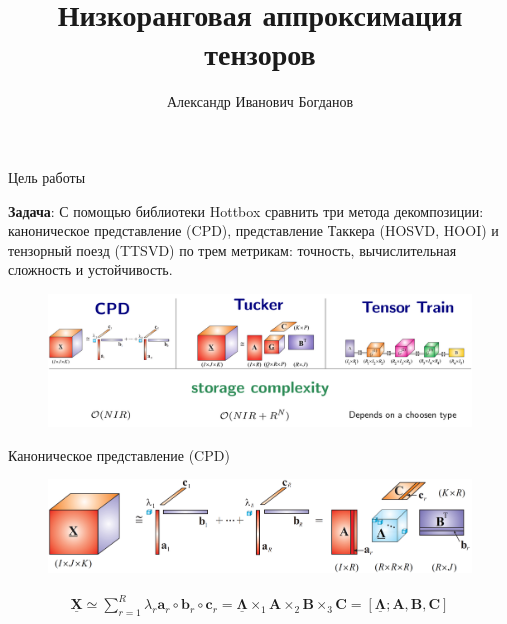 \documentclass{beamer}
\title[\hbox to 56mm{Низкоранговая аппроксимация тензоров}]{Низкоранговая аппроксимация тензоров}
\author[А. Б. Богданов]{Александр Иванович Богданов}
\institute[]{Московский физико-технический институт}
\date{\footnotesize
\par \textbf{Lab 405a}
\par\smallskip\emph{Курс:} Прогнозирование временных рядов}
\begin{document}

\begin{frame}

    \maketitle

\end{frame}


\begin{frame}{Цель работы}

    \textbf{Задача}: С помощью библиотеки Hottbox сравнить три метода декомпозиции: каноническое представление (CPD), представление Таккера (HOSVD, HOOI) и тензорный поезд (TTSVD) по трем метрикам: точность, вычислительная сложность и устойчивость.

    \begin{figure}
        \centering
        \includegraphics[width = \textwidth]{images/Storage_complexity.png}
    \end{figure}

\end{frame}


\begin{frame}{Каноническое представление (CPD)}

    \begin{figure}
        \centering
        \includegraphics[width = \textwidth]{images/TensorCPD.png}
    \end{figure}


    \begin{align*}
        \mathbf{\underline{X}} \simeq \sum_{r=1}^{R} \lambda_r \mathbf{a}_r \circ \mathbf{b}_r \circ \mathbf{c}_r = \mathbf{\underline{\Lambda}} \times_1 \mathbf{A} \times_2 \mathbf{B} \times_3 \mathbf{C} = \left[    \mathbf{\underline{\Lambda}}; \mathbf{A}, \mathbf{B}, \mathbf{C} \right]
    \end{align*}

\end{frame}
\end{document}
